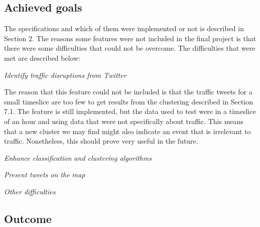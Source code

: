 \subsection{Achieved goals}
The specifications and which of them were implemented or not is described in
Section 2. The reasons some features were not included in the final project is
that there were some difficulties that could not be overcome.
The difficulties that were met are described below:

\emph{Identify traffic disruptions from Twitter}

The reason that this feature could not be included is that the traffic tweets
for a small timeslice are too few to get results from the clustering described
in Section 7.1. The feature is still implemented, but the data used to test
were in a timeslice of an hour and using data that were not specifically about
traffic. This means that a new cluster we may find might also indicate an
event that is irrelevant to traffic. Nonetheless, this should prove very useful
in the future.

\emph{Enhance classification and clustering algorithms}

\emph{Present tweets on the map}

\emph{Other difficulties}

\subsection{Outcome}
